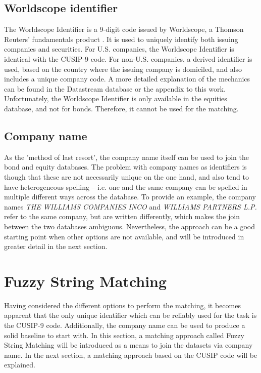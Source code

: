 \subsection{Worldscope identifier}
The Worldscope Identifier is a 9-digit code issued by Worldscope, a Thomson Reuters' fundamentals product \cite{worldscope}. It is used to uniquely identify both issuing companies and securities. For U.S. companies, the Worldscope Identifier is identical with the CUSIP-9 code. For non-U.S. companies, a derived identifier is used, based on the country where the issuing company is domiciled, and also includes a unique company code. A more detailed explanation of the mechanics can be found in the Datastream database or the appendix to this work. %
Unfortunately, the Worldscope Identifier is only available in the equities database, and not for bonds. Therefore, it cannot be used for the matching. 

\subsection{Company name}
As the 'method of last resort', the company name itself can be used to join the bond and equity databases. The problem with company names as identifiers is though that these are not necessarily unique on the one hand, and also tend to have heterogeneous spelling -- i.e. one and the same company can be spelled in multiple different ways across the database. To provide an example, the company names \textit{THE WILLIAMS COMPANIES INCO} and \textit{WILLIAMS PARTNERS L.P.} refer to the same company, but are written differently, which makes the join between the two databases ambiguous. Nevertheless, the approach can be a good starting point when other options are not available, and will be introduced in greater detail in the next section. 

\section{Fuzzy String Matching} \label{section:fuzzy-string-matching}
Having considered the different options to perform the matching, it becomes apparent that the only unique identifier which can be reliably used for the task is the CUSIP-9 code. Additionally, the company name can be used to produce a solid baseline to start with. In this section, a matching approach called Fuzzy String Matching will be introduced as a means to join the datasets via company name. In the next section, a matching approach based on the CUSIP code will be explained. 

